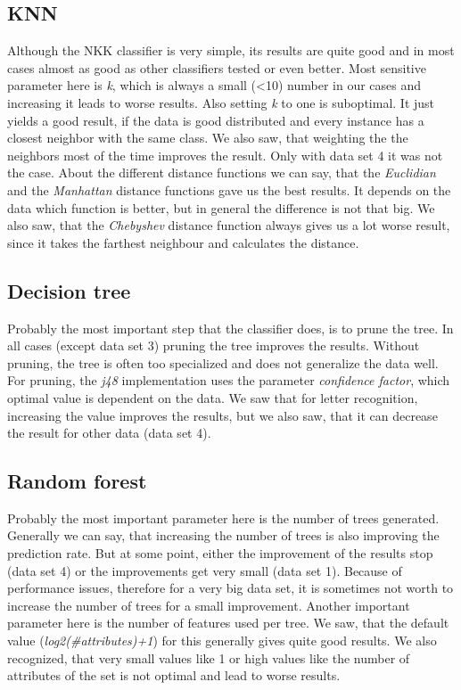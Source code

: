 \documentclass{article}
\begin{document}
\subsection{KNN}

Although the NKK classifier is very simple, its results are quite good and in most cases almost as good as other classifiers tested or even better. Most sensitive parameter here is \emph{k}, which is always a small (\textless10) number in our cases and increasing it leads to worse results. Also setting \emph{k} to one is suboptimal. It just yields a good result, if the data is good distributed and every instance has a closest neighbor with the same class. We also saw, that weighting the the neighbors most of the time improves the result. Only with data set 4 it was not the case. About the different distance functions we can say, that the \emph{Euclidian} and the \emph{Manhattan} distance functions gave us the best results. It depends on the data which function is better, but in general the difference is not that big. We also saw, that the \emph{Chebyshev} distance function always gives us a lot worse result, since it takes the farthest neighbour and calculates the distance. 


\subsection{Decision tree}

Probably the most important step that the classifier does, is to prune the tree. In all cases (except data set 3) pruning the tree improves the results. Without pruning, the tree is often too specialized and does not generalize the data well. For pruning, the \emph{j48} implementation uses the parameter \emph{confidence factor}, which optimal value is dependent on the data. We saw that for letter recognition, increasing the value improves the results, but we also saw, that it can decrease the result for other data (data set 4). 

\subsection{Random forest}

Probably the most important parameter here is the number of trees generated. Generally we can say, that increasing the number of trees is also improving the prediction rate. But at some point, either the improvement of the results stop (data set 4) or the improvements get very small (data set 1). Because of performance issues, therefore for a very big data set, it is sometimes not worth to increase the number of trees for a small improvement.
Another important parameter here is the number of features used per tree. We saw, that the default value (\emph{log2(\#attributes)+1}) for this generally gives quite good results. We also recognized, that very small values like 1 or high values like the number of attributes of the set is not optimal and lead to worse results. 
\end{document}
